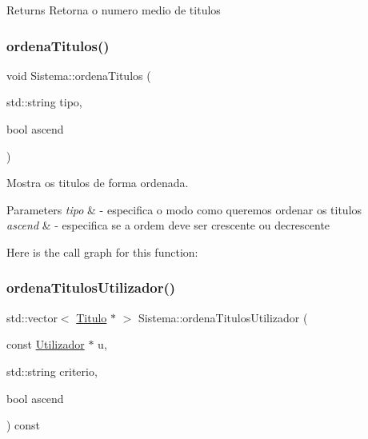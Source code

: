 \begin{DoxyReturn}{Returns}
Retorna o numero medio de titulos 
\end{DoxyReturn}
\mbox{\label{class_sistema_a6dcecc2ca65f6fdedd042c7431d5ea19}} 
\subsubsection{\texorpdfstring{ordena\+Titulos()}{ordenaTitulos()}}
{\footnotesize\ttfamily void Sistema\+::ordena\+Titulos (\begin{DoxyParamCaption}\item[{std\+::string}]{tipo,  }\item[{bool}]{ascend }\end{DoxyParamCaption})}



Mostra os titulos de forma ordenada. 


\begin{DoxyParams}{Parameters}
{\em tipo} & -\/ especifica o modo como queremos ordenar os titulos \\
\hline
{\em ascend} & -\/ especifica se a ordem deve ser crescente ou decrescente \\
\hline
\end{DoxyParams}
Here is the call graph for this function\+:
\mbox{\label{class_sistema_aade841c0c281c63fe922834e228049cd}} 
\subsubsection{\texorpdfstring{ordena\+Titulos\+Utilizador()}{ordenaTitulosUtilizador()}}
{\footnotesize\ttfamily std\+::vector$<$ \mbox{\hyperlink{class_titulo}{Titulo}} $\ast$ $>$ Sistema\+::ordena\+Titulos\+Utilizador (\begin{DoxyParamCaption}\item[{const \mbox{\hyperlink{class_utilizador}{Utilizador}} $\ast$}]{u,  }\item[{std\+::string}]{criterio,  }\item[{bool}]{ascend }\end{DoxyParamCaption}) const}



